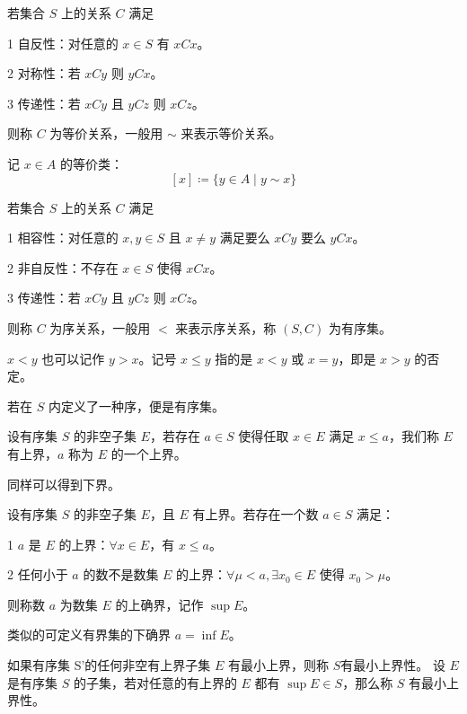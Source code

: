 \begin{definition}[等价关系]
	若集合 $S$ 上的关系 $C$ 满足

	\num{1} 自反性：对任意的 $x\in S$ 有 $xCx$。
	
	\num{2} 对称性：若 $xCy$ 则 $yCx$。

	\num{3} 传递性：若 $xCy$ 且 $yCz$ 则 $xCz$。

	则称 $C$ 为等价关系，一般用 $\sim$ 来表示等价关系。
\end{definition}

记 $x\in A$ 的等价类：
$$[x] \coloneqq  \{y \in A \mid y \sim x\}$$ 

\begin{definition}[序关系]
	若集合 $S$ 上的关系 $C$ 满足

	\num{1} 相容性：对任意的 $x,y\in S$ 且 $x\ne y$ 满足要么 $xCy$ 要么 $yCx$。
	
	\num{2} 非自反性：不存在 $x\in S$ 使得 $xCx$。

	\num{3} 传递性：若 $xCy$ 且 $yCz$ 则 $xCz$。

	则称 $C$ 为序关系，一般用 $<$ 来表示序关系，称 $(S,C)$ 为有序集。
\end{definition}

$x<y$ 也可以记作 $y>x$。记号 $x\leqslant y$ 指的是 $x<y$ 或 $x=y$，即是 $x>y$ 的否定。

若在 $S$ 内定义了一种序，便是有序集。

\begin{definition}[上界]
	设有序集 $S$ 的非空子集 $E$，若存在 $a \in S$ 使得任取 $x\in E$ 满足 $x \leqslant a$，我们称 $E$ 有上界，$a$ 称为 $E$ 的一个上界。 
\end{definition}

同样可以得到下界。

\begin{definition}[上确界]
	设有序集 $S$ 的非空子集 $E$，且 $E$ 有上界。若存在一个数 $a \in S$ 满足：
	
	\num{1} $a$ 是 $E$ 的上界：$\forall x\in E$，有 $x\leqslant a$。
	
	\num{2} 任何小于 $a$ 的数不是数集 $E$ 的上界：$\forall \mu<a, \exists x_0\in E$ 使得 $x_0>\mu$。
	
	则称数 $a$ 为数集 $E$ 的上确界，记作 $\sup E$。
\end{definition}

类似的可定义有界集的下确界 $a=\inf E$。

\begin{definition}[最小上界性]
	如果有序集 S'的任何非空有上界子集 $E$ 有最小上界，则称 $S$有最小上界性。
	设 $E$ 是有序集 $S$ 的子集，若对任意的有上界的 $E$ 都有 $\sup E \in S$，那么称 $S$ 有最小上界性。
\end{definition}

